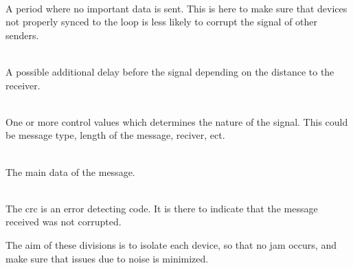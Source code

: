 \begin{description}[labelindent=\parindent]
	\item[Guard time]\hfill\\ 
	A period where no important data is sent.
	This is here to make sure that devices not properly synced to the loop is less likely to corrupt the signal of other senders.

	\item[Sync]\hfill\\ 
	A possible additional delay before the signal depending on the distance to the receiver.

	\item[Control]\hfill\\
	One or more control values which determines the nature of the signal. 
	This could be message type, length of the message, reciver, ect.

	\item[Data]\hfill\\
	The main data of the message.

	\item[\acrshort{crc} check]\hfill\\
	The \gls{crc} is an error detecting code. 
	It is there to indicate that the message received was not corrupted. 
\end{description}
\bigskip
\noindent

The aim of these divisions is to isolate each device, so that no jam occurs, and make sure that issues due to noise is minimized. 